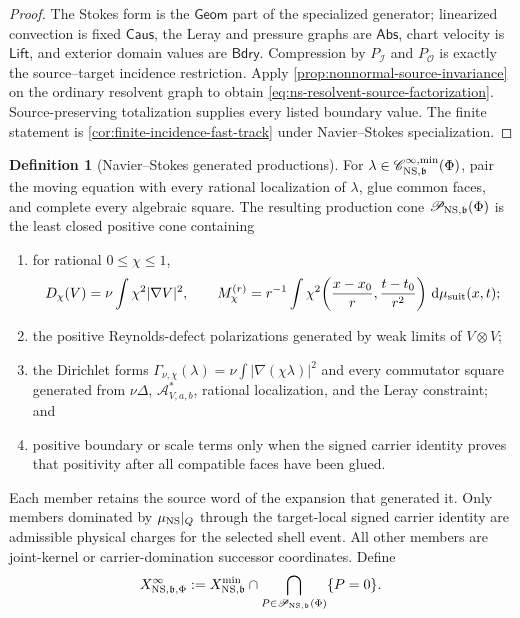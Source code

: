 \documentclass[11pt]{article}
\numberwithin{section}{part}
\theoremstyle{plain}
\theoremstyle{definition}
\newtheorem{definition}[definition]{Definition}
\theoremstyle{remark}
\newcommand{\dd}{\,\mathrm d}
\newcommand{\Geom}{\mathsf{Geom}}
\newcommand{\Caus}{\mathsf{Caus}}
\newcommand{\Abs}{\mathsf{Abs}}
\newcommand{\Lift}{\mathsf{Lift}}
\newcommand{\Bdry}{\mathsf{Bdry}}
\begin{document}
\begin{proof}
The Stokes form is the \(\Geom\) part of the specialized generator;
linearized convection is fixed \(\Caus\), the Leray and pressure graphs are
\(\Abs\), chart velocity is \(\Lift\), and exterior domain values are
\(\Bdry\).  Compression by \(P_{\mathscr I}\) and
\(P_{\mathscr O}\) is exactly the source--target incidence restriction.
Apply \cref{prop:nonnormal-source-invariance} on the ordinary resolvent graph
to obtain \eqref{eq:ns-resolvent-source-factorization}.  Source-preserving
totalization supplies every listed boundary value.  The finite statement is
\cref{cor:finite-incidence-fast-track} under Navier--Stokes specialization.
\end{proof}

\begin{definition}[Navier--Stokes generated productions]
\label{def:ns-generated-productions}
For
\(\lambda\in\mathscr C^{\infty,\min}_{{\rm NS},\mathfrak b}(\Phi)\),
pair the moving equation
with every rational localization of \(\lambda\), glue common faces, and
complete every algebraic square.  The resulting production cone
\(\mathscr P_{{\rm NS},\mathfrak b}(\Phi)\) is the least closed positive cone containing
\begin{enumerate}[label=\textup{(P\arabic*)}]
\item for rational \(0\le\chi\le1\),
\[
 D_\chi(V)=\nu\int\chi^2|\nabla V|^2,
 \qquad
 M^{(r)}_\chi
 =r^{-1}\int\chi^2\!\left(\frac{x-x_0}{r},
                    \frac{t-t_0}{r^2}\right)\dd\mu_{\rm suit}(x,t);
\]
\item the positive Reynolds-defect polarizations generated by weak limits of
\(V\otimes V\);
\item the Dirichlet forms
\(\Gamma_{\nu,\chi}(\lambda)=\nu\int|\nabla(\chi\lambda)|^2\)
and every commutator square generated from \(\nu\Delta\),
\(\mathcal A^*_{V,a,b}\), rational localization, and the Leray constraint;
and
\item positive boundary or scale terms only when the signed carrier identity
proves that positivity after all compatible faces have been glued.
\end{enumerate}
Each member retains the source word of the expansion that generated it.
Only members dominated by \(\mu_{\rm NS}|_Q\) through the target-local signed
carrier identity are admissible physical charges for the selected shell
event.  All other members are joint-kernel or carrier-domination successor
coordinates.  Define
\begin{equation}
 \label{eq:ns-target-cyclic-joint-kernel}
 X^\infty_{{\rm NS},\mathfrak b,\Phi}
 :=X^{\min}_{{\rm NS},\mathfrak b}\cap
   \bigcap_{P\in\mathscr P_{{\rm NS},\mathfrak b}(\Phi)}\{P=0\}.
\end{equation}
\end{definition}
\end{document}
